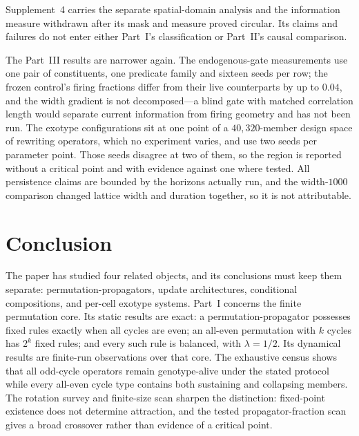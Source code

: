 \documentclass[man,12pt,floatsintext,donotrepeattitle]{apa7}
\begin{document}
Supplement~4 carries the separate spatial-domain analysis and the information
measure withdrawn after its mask and measure proved circular. Its claims and
failures do not enter either Part~I's classification or Part~II's causal
comparison.

The Part~III results are narrower again. The endogenous-gate measurements use one pair of
constituents, one predicate family and sixteen seeds per row; the frozen control's firing
fractions differ from their live counterparts by up to $0.04$, and the width gradient is
not decomposed---a blind gate with matched correlation length would separate current
information from firing geometry and has not been run. The exotype configurations sit at
one point of a $40{,}320$-member design space of rewriting operators, which no experiment
varies, and use two seeds per parameter point. Those seeds disagree at two of them, so the
region is reported without a critical point and with evidence against one where tested.
All persistence claims are bounded by the horizons actually run, and the width-$1000$
comparison changed lattice width and duration together, so it is not attributable.

\section{Conclusion}
\label{sec:conclusion}

The paper has studied four related objects, and its conclusions must keep them
separate: permutation-propagators, update architectures, conditional compositions, and
per-cell exotype systems. Part~I concerns the finite permutation core. Its static results are
exact: a permutation-propagator possesses fixed rules exactly when all cycles
are even; an all-even permutation with $k$ cycles has $2^k$ fixed rules; and
every such rule is balanced, with $\lambda=1/2$. Its dynamical results are
finite-run observations over that core. The exhaustive census shows that all
odd-cycle operators remain genotype-alive under the stated protocol while
every all-even cycle type contains both sustaining and collapsing members. The
rotation survey and finite-size scan sharpen the distinction: fixed-point
existence does not determine attraction, and the tested propagator-fraction
scan gives a broad crossover rather than evidence of a critical point.
\end{document}
